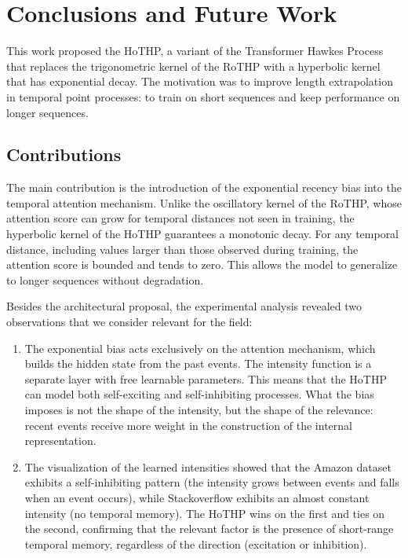 \chapter{Conclusions and Future Work}
\label{chap:conclusoes-e-trabalhos-futuros}

This work proposed the HoTHP, a variant of the Transformer Hawkes Process that replaces the trigonometric kernel of the RoTHP with a hyperbolic kernel that has exponential decay. The motivation was to improve length extrapolation in temporal point processes: to train on short sequences and keep performance on longer sequences.

\section{Contributions}

The main contribution is the introduction of the exponential recency bias into the temporal attention mechanism. Unlike the oscillatory kernel of the RoTHP, whose attention score can grow for temporal distances not seen in training, the hyperbolic kernel of the HoTHP guarantees a monotonic decay. For any temporal distance, including values larger than those observed during training, the attention score is bounded and tends to zero. This allows the model to generalize to longer sequences without degradation.

Besides the architectural proposal, the experimental analysis revealed two observations that we consider relevant for the field:

\begin{enumerate}
    \item The exponential bias acts exclusively on the attention mechanism, which builds the hidden state from the past events. The intensity function is a separate layer with free learnable parameters. This means that the HoTHP can model both self-exciting and self-inhibiting processes. What the bias imposes is not the shape of the intensity, but the shape of the relevance: recent events receive more weight in the construction of the internal representation.

    \item The visualization of the learned intensities showed that the Amazon dataset exhibits a self-inhibiting pattern (the intensity grows between events and falls when an event occurs), while Stackoverflow exhibits an almost constant intensity (no temporal memory). The HoTHP wins on the first and ties on the second, confirming that the relevant factor is the presence of short-range temporal memory, regardless of the direction (excitation or inhibition).
\end{enumerate}

